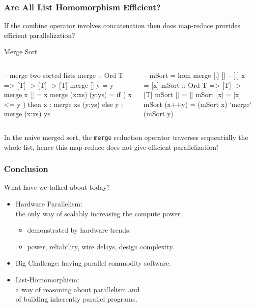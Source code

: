 \documentclass{beamer}
\renewcommand{\emph}[1]{\textcolor{structure}{#1}}
\newcommand{\emp}[1]{\textcolor{DikuRed}{ #1}}
\begin{document}
\begin{frame}[fragile,t]
  \frametitle{Are All List Homomorphism Efficient?}

If the combine operator involves concatenation then does
map-reduce provides efficient parallelization? 

\begin{block}{Merge Sort} \vspace{-1.5 ex}
\begin{columns}
\begin{colorcode}[fontsize=\scriptsize]
-- merge two sorted lists
merge :: Ord T => [T] -> [T] -> [T]
merge [] y  = y
merge x  [] = x
merge (x:xs) (y:ys) = 
  if ( x <= y ) 
  then x : merge xs (y:ys)
  else y : merge (x:xs) ys 
\end{colorcode}
\begin{colorcode}[fontsize=\scriptsize]
-- \emph{mSort} = \emp{hom merge [.] []}
-- [.] x = [x]  
\emph{mSort} :: Ord T => [T] -> [T]
\emph{mSort} []     = \emp{[]}
\emph{mSort} [x]    = \emp{[x]}
\emph{mSort} (x++y) = (\emph{mSort} x) \emp{`merge`}  
               (\emph{mSort} y)
\end{colorcode}
\end{columns}
\end{block}

In the naive merged sort, the {\tt merge} reduction operator
traverses sequentially the whole list, hence this map-reduce 
does not give efficient parallelization!

\end{frame}


\begin{frame}[fragile,t]
  \frametitle{Conclusion}

What have we talked about today?\bigskip
\begin{itemize}
    \item Hardware Parallelism:\\ the only way of scalably increasing the compute power.
        \begin{itemize}
            \item demonstrated by hardware trends:
            \item power, reliability, wire delays, design complexity.\bigskip
        \end{itemize}
    \item Big Challenge: having parallel commodity software.\bigskip
    \item List-Homomorphism:\\ a way of reasoning about parallelism and\\ of building inherently parallel programs.  
\end{itemize}
\end{frame}
\end{document}

